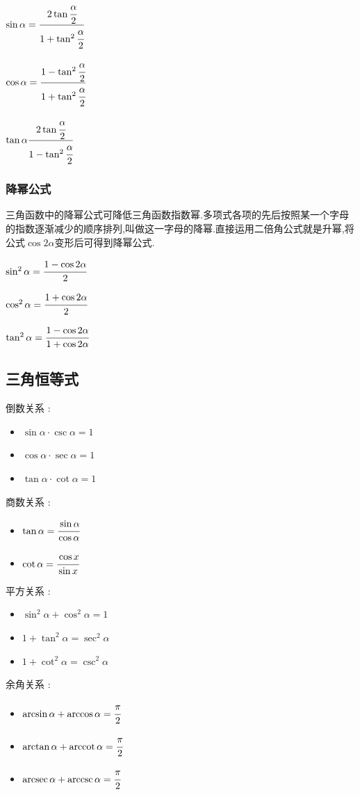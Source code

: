 {{{    $\sin\alpha = \cfrac{2\tan\cfrac{\alpha}{2}}{1+\tan^2\cfrac{\alpha}{2}}$

    $\cos\alpha = \cfrac{1 - \tan^2\cfrac{\alpha}{2}}{1 + \tan^2\cfrac{\alpha}{2}}$

    $\tan\alpha \cfrac{2\tan\cfrac{\alpha}{2}}{1 - \tan^2\cfrac{\alpha}{2}}$
  }%

  \subsubsection{降幂公式}{
    三角函数中的降幂公式可降低三角函数指数幂.多项式各项的先后按照某一个字母的指数逐渐减少的顺序排列,叫做这一字母的降幂.直接运用二倍角公式就是升幂,将公式$\cos 2 \alpha$变形后可得到降幂公式.

    $\sin^2\alpha = \cfrac{1 - \cos2\alpha}{2}$

    $\cos^2\alpha = \cfrac{1 + \cos2\alpha}{2}$

    $\tan^2\alpha = \cfrac{1 - \cos2\alpha}{1 + \cos2\alpha}$
  }%

}%

\subsection{三角恒等式}{

  倒数关系 :
  \begin{itemize}
    \item $\sin\alpha \cdot \csc\alpha = 1$
    \item $\cos\alpha \cdot \sec\alpha = 1$
    \item $\tan\alpha \cdot \cot\alpha = 1$
  \end{itemize}

  商数关系 :
  \begin{itemize}
    \item $\tan\alpha = \cfrac{\sin\alpha}{\cos\alpha}$
    \item $\cot\alpha = \cfrac{\cos x}{\sin x}$
  \end{itemize}

  平方关系 :
  \begin{itemize}
    \item $\sin^2\alpha + \cos^2\alpha = 1$
    \item $1 + \tan^2\alpha = \sec^2\alpha$
    \item $1 + \cot^2\alpha = \csc^2\alpha$
  \end{itemize}

  余角关系 :
  \begin{itemize}
    \item $\arcsin\alpha + \arccos\alpha = \cfrac{\pi}{2}$
    \item $\arctan\alpha + \operatorname{arccot}\alpha = \cfrac{\pi}{2}$
    \item $\operatorname{arcsec}\alpha + \operatorname{arccsc}\alpha = \cfrac{\pi}{2}$
  \end{itemize}

}}
